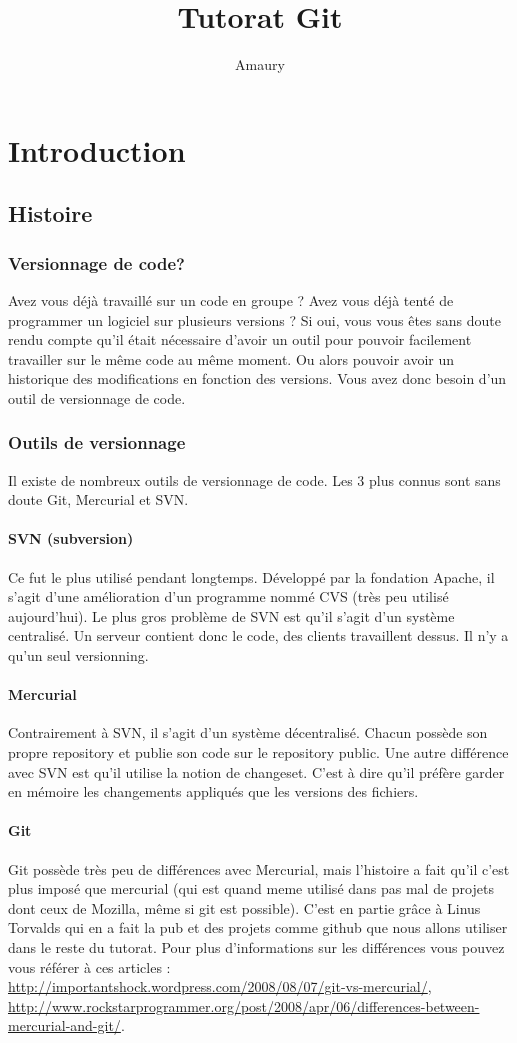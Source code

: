 \documentclass[a4paper,10pt]{article}
\title{Tutorat Git}
\author{Amaury \textesc{Louarn}}
\begin{document}
\newpage

\section{Introduction}
  \subsection{Histoire}
    \subsubsection{Versionnage de code?}
Avez vous déjà travaillé sur un code en groupe ? Avez vous déjà tenté de programmer un logiciel sur plusieurs versions ? Si oui, vous vous êtes sans doute rendu compte qu'il était nécessaire d'avoir un outil pour pouvoir facilement travailler sur le même code au même moment. Ou alors pouvoir avoir un historique des modifications en fonction des versions. Vous avez donc besoin d'un outil de versionnage de code.
    \subsubsection{Outils de versionnage}
Il existe de nombreux outils de versionnage de code. Les 3 plus connus sont sans doute Git, Mercurial et SVN.
      \paragraph{SVN (subversion)}
Ce fut le plus utilisé pendant longtemps. Développé par la fondation Apache, il s'agit d'une amélioration d'un programme nommé CVS (très peu utilisé aujourd'hui). Le plus gros problème de SVN est qu'il s'agit d'un système centralisé. Un serveur contient donc le code, des clients travaillent dessus. Il n'y a qu'un seul versionning.
      \paragraph{Mercurial}
Contrairement à SVN, il s'agit d'un système décentralisé. Chacun possède son propre repository et publie son code sur le repository public. Une autre différence avec SVN est qu'il utilise la notion de changeset. C'est à dire qu'il préfère garder en mémoire les changements appliqués que les versions des fichiers.
      \paragraph{Git}
Git possède très peu de différences avec Mercurial, mais l'histoire a fait qu'il c'est plus imposé que mercurial (qui est quand meme utilisé dans pas mal de projets dont ceux de Mozilla, même si git est possible).
C'est en partie grâce à Linus Torvalds qui en a fait la pub et des projets comme github que nous allons utiliser dans le reste du tutorat.
Pour plus d'informations sur les différences vous pouvez vous référer à ces articles : \url{http://importantshock.wordpress.com/2008/08/07/git-vs-mercurial/}, \url{http://www.rockstarprogrammer.org/post/2008/apr/06/differences-between-mercurial-and-git/}.
\end{document}
